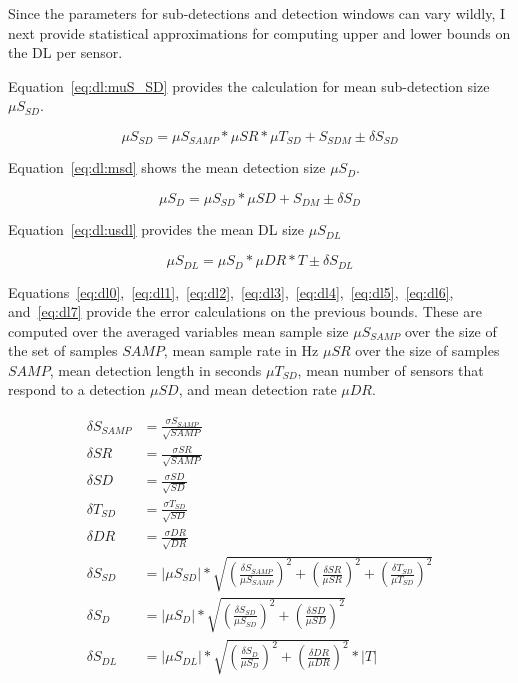 Since the parameters for sub-detections and detection windows can vary wildly, I next provide statistical approximations for computing upper and lower bounds on the DL per sensor.

Equation~\ref{eq:dl:muS_SD} provides the calculation for mean sub-detection size $\mu S_{SD}$.

\begin{equation}\label{eq:dl:muS_SD}
	\mu S_{SD} = \mu S_{SAMP} * \mu SR * \mu T_{SD} + S_{SDM} \pm \delta S_{SD}
\end{equation}

Equation~\ref{eq:dl:msd} shows the mean detection size $\mu S_{D}$.

\begin{equation}\label{eq:dl:msd}
	\mu S_{D} = \mu S_{SD} * \mu SD + S_{DM} \pm \delta S_{D}
\end{equation}

Equation~\ref{eq:dl:usdl} provides the mean DL size $\mu S_{DL}$

\begin{equation}\label{eq:dl:usdl}
	\mu S_{DL} = \mu S_{D} * \mu DR * T \pm \delta S_{DL}
\end{equation}

Equations~\ref{eq:dl0},~\ref{eq:dl1},~\ref{eq:dl2},~\ref{eq:dl3},~\ref{eq:dl4},~\ref{eq:dl5},~\ref{eq:dl6}, and~\ref{eq:dl7} provide the error calculations on the previous bounds. These are computed over the averaged variables mean sample size $\mu S_{SAMP}$ over the size of the set of samples $SAMP$, mean sample rate in Hz $\mu SR$ over the size of samples $SAMP$, mean detection length in seconds $\mu T_{SD}$, mean number of sensors that respond to a detection $\mu SD$, and mean detection rate $\mu DR$.

\begin{align}
	\delta S_{SAMP} &= \frac{\sigma S_{SAMP}}{\sqrt{SAMP}} \label{eq:dl0} \\
	\delta SR &= \frac{\sigma SR}{\sqrt{SAMP}} \label{eq:dl1} \\
	\delta SD &= \frac{\sigma SD}{\sqrt{SD}} \label{eq:dl2} \\
	\delta T_{SD} &= \frac{\sigma T_{SD}}{\sqrt{SD}} \label{eq:dl3} \\
	\delta DR &= \frac{\sigma DR}{\sqrt{DR}} \label{eq:dl4} \\
	\delta S_{SD} &= |\mu S_{SD}| * \sqrt{(\frac{\delta S_{SAMP}}{\mu S_{SAMP}})^2 + (\frac{\delta SR}{\mu SR})^2 + (\frac{\delta T_{SD}}{\mu T_{SD}})^2} \label{eq:dl5} \\
	\delta S_{D} &= |\mu S_{D}| * \sqrt{(\frac{\delta S_{SD}}{\mu S_{SD}})^2 + (\frac{\delta SD}{\mu SD})^2} \label{eq:dl6} \\
	\delta S_{DL} &= |\mu S_{DL}| * \sqrt{(\frac{\delta S_{D}}{\mu S_{D}})^2 + (\frac{\delta DR}{\mu DR})^2} * |T| \label{eq:dl7}
\end{align}

